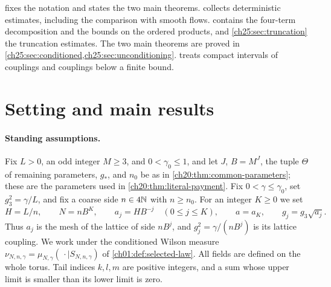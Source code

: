  fixes the notation and states the two main theorems.  collects deterministic estimates, including the comparison with smooth flows.  contains the four-term decomposition and the bounds on the ordered products, and \cref{ch25:sec:truncation} the truncation estimates. The two main theorems are proved in \cref{ch25:sec:conditioned,ch25:sec:unconditioning}.  treats compact intervals of couplings and couplings below a finite bound.

\section{Setting and main results}\label{ch25:sec:setting}

\paragraph{Standing assumptions.}
Fix $L>0$, an odd integer $M\ge3$, and $0<\gamma_0\le1$, and let $J$, $B=M^J$, the tuple $\Theta$ of remaining parameters, $g_*$, and $n_0$ be as in \cref{ch20:thm:common-parameters}; these are the parameters used in \cref{ch20:thm:literal-payment}. Fix $0<\gamma\le\gamma_0$, set $g_3^2=\gamma/L$, and fix a coarse side $n\in4\mathbb N$ with $n\ge n_0$. For an integer $K\ge0$ we set
\[
 H=L/n,\qquad N=nB^K,\qquad a_j=HB^{-j}\quad(0\le j\le K),\qquad a=a_K,\qquad g_j=g_3\sqrt{a_j}.
\]
Thus $a_j$ is the mesh of the lattice of side $nB^j$, and $g_j^2=\gamma/(nB^j)$ is its lattice coupling. We work under the conditioned Wilson measure $\nu_{N,n,\gamma}=\mu_{N,\gamma}(\,\cdot\mid S_{N,n,\gamma})$ of \cref{ch01:def:selected-law}. All fields are defined on the whole torus. Tail indices $k,l,m$ are positive integers, and a sum whose upper limit is smaller than its lower limit is zero.

